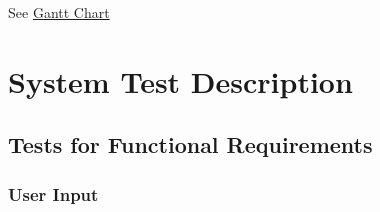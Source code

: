 \documentclass[12pt, titlepage]{article}
\begin{document}
See \href{https://gitlab.cas.mcmaster.ca/kongx9/3xa3-404/-/blob/master/Blankproject/ProjectSchedule/Milestone.pdf}{Gantt Chart}


\section{System Test Description}
	
\subsection{Tests for Functional Requirements}

\subsubsection{User Input}
\end{document}
